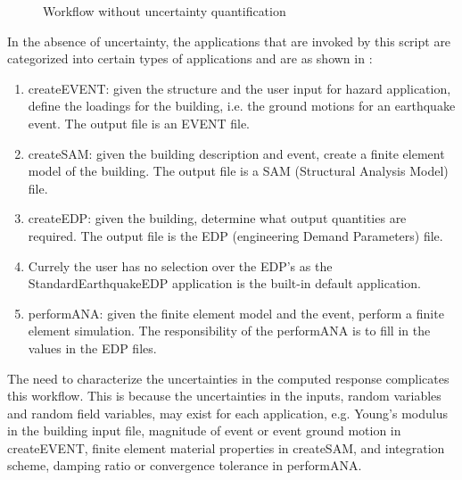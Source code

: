 \begin{figure}[!htbp]
  \caption{Workflow without uncertainty quantification}
  \label{fig:figure17}
\end{figure}


In the absence of uncertainty, the applications that are invoked by
this script are categorized into certain types of applications and are
as shown in :
\begin{enumerate}
\item createEVENT: given the structure and the user input for hazard
  application, define the loadings for the building, i.e. the ground
  motions for an earthquake event. The output file is an EVENT file.
\item createSAM: given the building description and event, create a
  finite element model of the building. The output file is a SAM
  (Structural Analysis Model) file.
\item createEDP: given the building, determine what output quantities
  are required. The output file is the EDP (engineering Demand
  Parameters) file.
\item Currely the user has no selection over the EDP’s as the
  StandardEarthquakeEDP application is the built-in default
  application.
\item performANA: given the finite element model and the event,
  perform a finite element simulation. The responsibility of the
  performANA is to fill in the values in the EDP files.
\end{enumerate}


The need to characterize the uncertainties in the computed response
complicates this workflow. This is because the uncertainties in the
inputs, random variables and random field variables, may exist for
each application, e.g. Young’s modulus in the building input file,
magnitude of event or event ground motion in createEVENT, finite
element material properties in createSAM, and integration scheme,
damping ratio or convergence tolerance in performANA.

